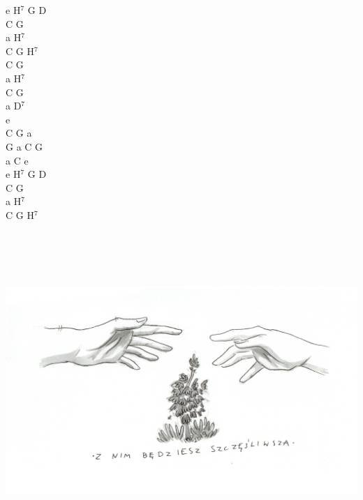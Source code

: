 \documentclass[a5paper, 10pt]{book}
\begin{document}
\begin{minipage}[t]{0.2\textwidth}
  e H$^7$ G D\\
  C G\\
  a H$^7$\\
  C G H$^7$\\

  C G\\
  a H$^7$\\
  C G\\
  a D$^7$\\
  e\\
  C G a\\
  G a C G\\
  a C e\\

  e H$^7$ G D\\
  C G\\
  a H$^7$\\
  C G H$^7$\\
\end{minipage}
~\\~\\~\\~\\
\includegraphics[width=\textwidth, center]{z_nim_bedziesz_szczesliwsza.png}\\

\newpage
\end{document}

